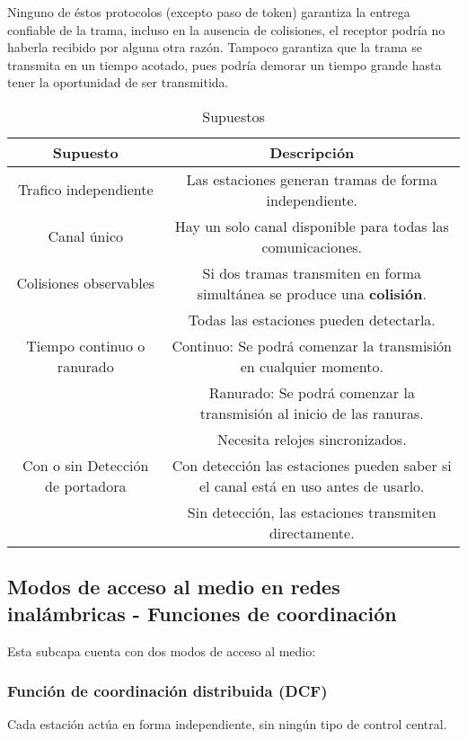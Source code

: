 \documentclass{book}
\begin{document}
	Ninguno de éstos protocolos (excepto paso de token) garantiza la entrega confiable de la trama, incluso en la ausencia de colisiones, el receptor podría no haberla recibido por alguna otra razón. Tampoco garantiza que la trama se transmita en un tiempo acotado, pues podría demorar un tiempo grande hasta tener la oportunidad de ser transmitida.
	
	\begin{table}[H]
		\centering
		\begin{tabular}{|c|c|}
			\hline
			\textbf{Supuesto}&\textbf{Descripción}\\
			\hline
			Trafico independiente&Las estaciones generan tramas de forma independiente.\\
			\hline
			Canal único&Hay un solo canal disponible para todas las comunicaciones.\\
			\hline
			Colisiones observables&Si dos tramas transmiten en forma simultánea se produce una \textbf{colisión}.\\
			&Todas las estaciones pueden detectarla.\\
			\hline
			Tiempo continuo o ranurado&Continuo: Se podrá comenzar la transmisión en cualquier momento.\\
			&Ranurado: Se podrá comenzar la transmisión al inicio de las ranuras.\\
			&Necesita relojes sincronizados.\\
			\hline
			Con o sin Detección de portadora&Con detección las estaciones pueden saber si el canal está en uso antes de usarlo.\\
			&Sin detección, las estaciones transmiten directamente.\\
			\hline
		\end{tabular}
		\caption{Supuestos}
		\label{tab:supuestos}
	\end{table}
	
	\subsection{Modos de acceso al medio en redes inalámbricas - Funciones de coordinación}
	Esta subcapa cuenta con dos modos de acceso al medio:
	
	\subsubsection{Función de coordinación distribuida (DCF)}
	Cada estación actúa en forma independiente, sin ningún tipo de control central.
	
\end{document}
